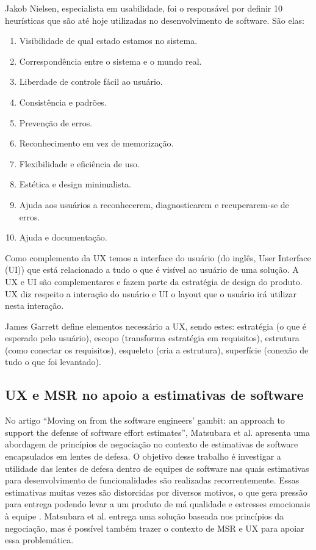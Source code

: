 \documentclass[12pt]{article}
\begin{document}
Jakob Nielsen, especialista em usabilidade, foi o responsável por definir 10 heurísticas que são até hoje utilizadas no desenvolvimento de software. São elas:
\begin{enumerate}
    \item Visibilidade de qual estado estamos no sistema.
    \item Correspondência entre o sistema e o mundo real.
    \item Liberdade de controle fácil ao usuário.
    \item Consistência e padrões.
    \item Prevenção de erros.
    \item Reconhecimento em vez de memorização.
    \item Flexibilidade e eficiência de uso.
    \item Estética e design minimalista.
    \item Ajuda aos usuários a reconhecerem, diagnosticarem e recuperarem-se de erros.
    \item Ajuda e documentação.
\end{enumerate}

Como complemento da UX temos a interface do usuário (do inglês, User Interface (UI)) que está relacionado a tudo o que é visível ao usuário de uma solução. A UX e UI são complementares e fazem parte da estratégia de design do produto. UX diz respeito a interação do usuário e UI o layout que o usuário irá utilizar nesta interação. 

James Garrett define elementos necessário a UX, sendo estes: estratégia (o que é esperado pelo usuário), escopo (transforma estratégia em requisitos), estrutura (como conectar os requisitos), esqueleto (cria a estrutura), superfície (conexão de tudo o que foi levantado).

\subsection{UX e MSR no apoio a estimativas de software}
No artigo ``Moving on from the software engineers' gambit: an approach to support the defense of software effort estimates'', Matsubara et al. apresenta uma abordagem de princípios de negociação no contexto de estimativas de software encapsulados em lentes de defesa. O objetivo desse trabalho é investigar a utilidade das lentes de defesa dentro de equipes de software nas quais estimativas para desenvolvimento de funcionalidades são realizadas recorrentemente. Essas estimativas muitas vezes são distorcidas por diversos motivos, o que gera pressão para entrega podendo levar a um produto de má qualidade e estresses emocionais à equipe  \cite{matsubara2023moving}. Matsubara et al. entrega uma solução baseada nos princípios da negociação, mas é possível também trazer o contexto de MSR e UX para apoiar essa problemática.
\end{document}
